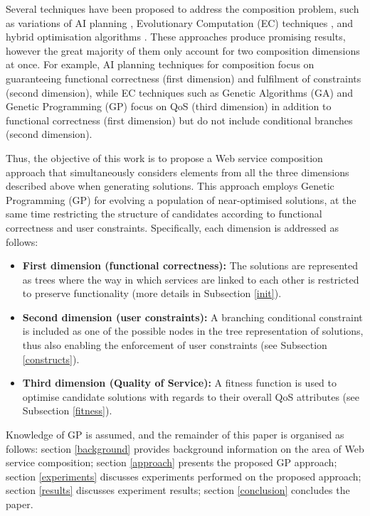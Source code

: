 \documentclass[conference]{IEEEtran}
\begin{document}
Several techniques have been proposed to address the composition problem, such as variations of AI planning \cite{chen2014qos}, Evolutionary
Computation (EC) techniques \cite{wang2012survey}, and hybrid optimisation algorithms \cite{pop2010immune}. These approaches produce promising results,
however the great majority of them only account for two composition dimensions at once. For example, AI planning techniques for
composition focus on guaranteeing functional correctness (first dimension) and fulfilment of constraints (second dimension),
while EC techniques such as Genetic Algorithms (GA) and Genetic Programming (GP) focus on QoS (third dimension) in addition to functional correctness (first dimension) but do not include conditional branches (second dimension).

Thus, the objective of this work is to propose a Web service composition approach that simultaneously considers elements from all the three dimensions
described above when generating solutions. This approach employs Genetic Programming (GP) for evolving a population of near-optimised solutions,
at the same time restricting the structure of candidates according to functional correctness and user constraints. Specifically, each dimension
is addressed as follows:

\begin{itemize}
 \item \textbf{First dimension (functional correctness):} The solutions are represented as trees where the way in which services are linked
 to each other is restricted to preserve functionality (more details in Subsection \ref{init}).
 \item \textbf{Second dimension (user constraints):} A branching conditional constraint is included as one of the possible nodes in the tree
 representation of solutions, thus also enabling the enforcement of user constraints (see Subsection \ref{constructs}).
 \item \textbf{Third dimension (Quality of Service):} A fitness function is used to optimise candidate solutions with regards to their overall
 QoS attributes (see Subsection \ref{fitness}).
\end{itemize}

Knowledge of GP \cite{banzhaf1998genetic} is assumed, and the remainder of this paper is organised as follows: section \ref{background} provides background information on the 
area of Web service composition; section \ref{approach} presents the proposed GP approach; section \ref{experiments} discusses experiments performed on the proposed approach; section \ref{results} discusses experiment results; section \ref{conclusion} concludes the paper.
\end{document}

